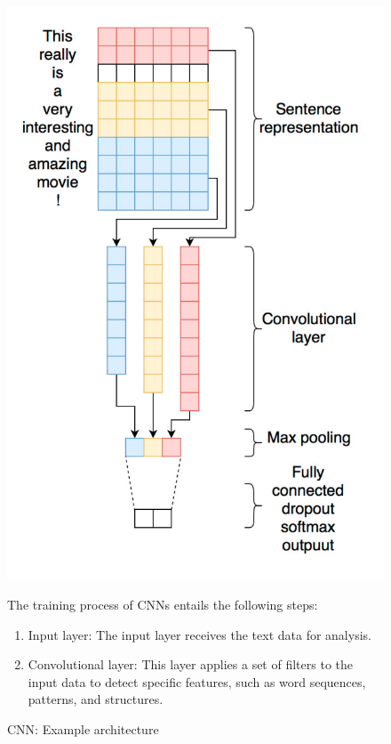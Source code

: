 \documentclass[a4paper]{article}
\begin{document}
\begin{figure}[H]
    \centering
    \begin{minipage}{0.48\textwidth}
      \centering
      \includegraphics[width=\linewidth]{./images/CNN_architecture.png}
      \caption{CNN: Example architecture}
      \label{fig.CNN[CNN for situations understanding based on sentiment analysis of twitter data]}
    \end{minipage}\hfill
    \begin{minipage}{0.48\textwidth}
        The training process of CNNs entails the following steps:
        \begin{enumerate}
            \item Input layer: The input layer receives the text data for analysis.
            \item Convolutional layer: This layer applies a set of filters to the input data to detect specific features, such as word sequences, patterns, and structures.

\end{enumerate}
\end{minipage}
\end{figure}
\end{document}
